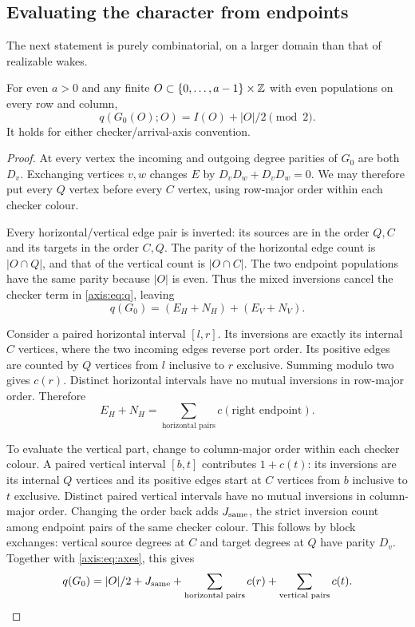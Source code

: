 \subsection{Evaluating the character from endpoints}\label{axis:sec:endpoints}
The next statement is purely combinatorial, on a larger domain than that of
realizable wakes.

\begin{theorem}\label{axis:thm:endpoint}
For even $a>0$ and any finite $O\subset\{0,\ldots,a-1\}\times\mathbb Z$ with even
populations on every row and column,
\begin{equation}\label{axis:eq:endpoint}
 q(G_0(O);O)=I(O)+|O|/2\pmod2.
\end{equation}
It holds for either checker/arrival-axis convention.
\end{theorem}
\begin{proof}
At every vertex the incoming and outgoing degree parities of $G_0$ are both
$D_v$. Exchanging vertices $v,w$ changes $E$ by
$D_vD_w+D_vD_w=0$. We may therefore put every $Q$ vertex before every $C$
vertex, using row-major order within each checker colour.

Every horizontal/vertical edge pair is inverted: its sources are in the order
$Q,C$ and its targets in the order $C,Q$. The parity of the horizontal edge
count is $|O\cap Q|$, and that of the vertical count is $|O\cap C|$.
The two endpoint populations have the same parity because $|O|$ is even.
Thus the mixed inversions cancel the checker term in \eqref{axis:eq:q}, leaving
\begin{equation}\label{axis:eq:axes}
 q(G_0)=(E_H+N_H)+(E_V+N_V).
\end{equation}

Consider a paired horizontal interval $[l,r]$. Its inversions are exactly its
internal $C$ vertices, where the two incoming edges reverse port order.
Its positive edges are counted by $Q$ vertices from $l$ inclusive to $r$
exclusive. Summing modulo two gives $c(r)$. Distinct horizontal intervals
have no mutual inversions in row-major order. Therefore
\[
 E_H+N_H=\sum_{\text{horizontal pairs}}c(\text{right endpoint}).
\]

To evaluate the vertical part, change to column-major order within each
checker colour. A paired vertical interval $[b,t]$ contributes
$1+c(t)$: its inversions are its internal $Q$ vertices and its positive
edges start at $C$ vertices from $b$ inclusive to $t$ exclusive. Distinct
paired vertical intervals have no mutual inversions in column-major order.
Changing the order back adds $J_{\rm same}$, the strict inversion count among
endpoint pairs of the same checker colour. This follows by block exchanges:
vertical source degrees at $C$ and target degrees at $Q$ have parity $D_v$.
Together with \eqref{axis:eq:axes}, this gives
\begin{equation}\label{axis:eq:ranks}
 q(G_0)=|O|/2+J_{\rm same}
 +\sum_{\text{horizontal pairs}}c(r)+\sum_{\text{vertical pairs}}c(t).
\end{equation}


\end{proof}
